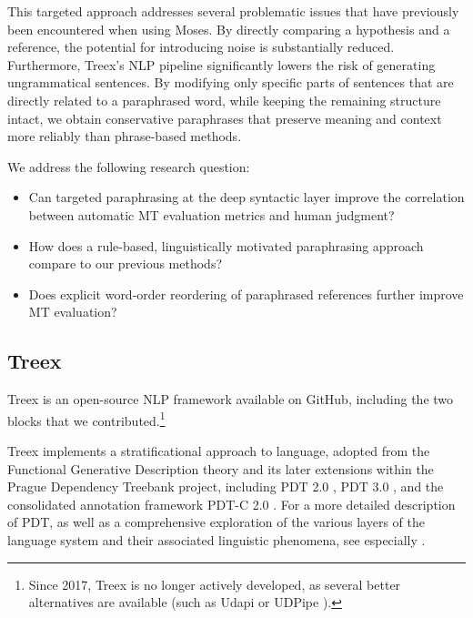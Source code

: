 This targeted approach addresses several problematic issues that have previously been encountered when using Moses. By directly comparing a hypothesis and a reference, the potential for introducing noise is substantially reduced. Furthermore, Treex's NLP pipeline significantly lowers the risk of generating ungrammatical sentences. By modifying only specific parts of sentences that are directly related to a paraphrased word, while keeping the remaining structure intact, we obtain conservative paraphrases that preserve meaning and context more reliably than phrase-based methods.

\pagebreak

\begin{mdframed}[
    linecolor=gray,
    linewidth=2pt,
    roundcorner=5,
    backgroundcolor=gray!5
]
\noindent
We address the following research question:
\begin{itemize}
    \item Can targeted paraphrasing at the deep syntactic layer improve the correlation between automatic MT evaluation metrics and human judgment?
    \item How does a rule-based, linguistically motivated paraphrasing approach compare to our previous methods?
    \item Does explicit word-order reordering of paraphrased references further improve MT evaluation?
\end{itemize}
\end{mdframed}

\subsection{Treex}
Treex is an open-source NLP framework available on GitHub, including the two blocks that we contributed.\footnote{Since 2017, Treex is no longer actively developed, as several better alternatives are available (such as Udapi \citep{popel-etal-2017-udapi} or UDPipe \citep{straka-2018-udpipe}).}

Treex implements a stratificational approach to language, adopted from the Functional Generative Description theory \citep{FGP} and its later extensions within the Prague Dependency Treebank project, including PDT 2.0 \citep{pdt20}, PDT 3.0 \citep{PDT3.0}, and the consolidated annotation framework PDT-C 2.0 \citep{pdtc20}. For a more detailed description of PDT, as well as a comprehensive exploration of the various layers of the language system and their associated linguistic phenomena, see especially \cite{hajicova-tal-tecto-2000,pdt-for-ling-research-16}.

